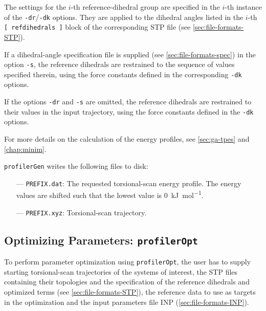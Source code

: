 \documentclass[10pt,a4paper,openany]{memoir}
\numberwithin{equation}{section}
\newcommand{\profileropt}[0]{\texttt{profilerOpt}}
\newcommand{\profilergen}[0]{\texttt{profilerGen}}
\begin{document}
The settings for the $i$-th reference-dihedral group are specified in the $i$-th
instance of the \texttt{-dr}/\texttt{-dk} options. They are applied to the
dihedral angles listed in the $i$-th \texttt{[~refdihedrals~]} block of the
corresponding STP file (see \autoref{sec:file-formats-STP}).
%

If a dihedral-angle specification file is supplied (see
\autoref{sec:file-formats-spec}) in the option \texttt{-s}, the reference
dihedrals are restrained to the sequence of values specified therein, using the
force constants defined in the corresponding \texttt{-dk} options.

%
If the options \texttt{-dr} and \texttt{-s} are omitted, the reference
dihedrals are restrained to their values in the input trajectory,
using the force constants defined in the \texttt{-dk} options.
%

For more details on the calculation of the energy profiles, see
\autoref{sec:ga-tpes} and \autoref{chap:minim}.

\profilergen{} writes the following files to disk:
\begin{itemize}
\item[---] \texttt{PREFIX.dat}: The requested torsional-scan energy profile. The energy values are shifted such that the lowest value is \SI{0}{\kJ\per\mole}.
\item[---] \texttt{PREFIX.xyz}: Torsional-scan trajectory.
\end{itemize}


\subsection{Optimizing Parameters: \profileropt{}}
\label{sec:program-opt}

To perform parameter optimization using \profileropt{}, the user has
to supply starting torsional-scan trajectories of the systems of
interest, the STP files containing their topologies and the
specification of the reference dihedrals and optimized terms (see
\autoref{sec:file-formats-STP}), the reference data to use as targets
in the optimization and the input parameters file INP
(\autoref{sec:file-formats-INP}).
\end{document}
